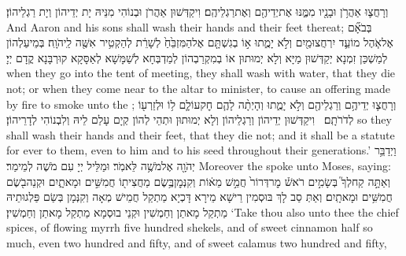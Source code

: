 {וְרָחֲצ֛וּ אַהֲרֹ֥ן וּבָנָ֖יו מִמֶּ֑נּוּ אֶת\maqqaf יְדֵיהֶ֖ם וְאֶת\maqqaf רַגְלֵיהֶֽם׃}
{וִיקַדְּשׁוּן אַהֲרֹן וּבְנוֹהִי מִנֵּיהּ יָת יְדֵיהוֹן וְיָת רַגְלֵיהוֹן׃}
{And Aaron and his sons shall wash their hands and their feet thereat;}{}
{בְּבֹאָ֞ם אֶל\maqqaf אֹ֧הֶל מוֹעֵ֛ד יִרְחֲצוּ\maqqaf מַ֖יִם וְלֹ֣א יָמֻ֑תוּ א֣וֹ בְגִשְׁתָּ֤ם אֶל\maqqaf הַמִּזְבֵּ֙חַ֙ לְשָׁרֵ֔ת לְהַקְטִ֥יר אִשֶּׁ֖ה לַֽיהֹוָֽה׃}
{בְּמֵיעַלְהוֹן לְמַשְׁכַּן זִמְנָא יְקַדְּשׁוּן מַיָּא וְלָא יְמוּתוּן אוֹ בְמִקְרַבְהוֹן לְמַדְבְּחָא לְשַׁמָּשָׁא לְאַסָּקָא קוּרְבָּנָא קֳדָם יְיָ׃}
{when they go into the tent of meeting, they shall wash with water, that they die not; or when they come near to the altar to minister, to cause an offering made by fire to smoke unto the \lord;}{}
{וְרָחֲצ֛וּ יְדֵיהֶ֥ם וְרַגְלֵיהֶ֖ם וְלֹ֣א יָמֻ֑תוּ וְהָיְתָ֨ה לָהֶ֧ם חׇק\maqqaf עוֹלָ֛ם ל֥וֹ וּלְזַרְע֖וֹ לְדֹרֹתָֽם׃ \petucha }
{וִיקַדְּשׁוּן יְדֵיהוֹן וְרַגְלֵיהוֹן וְלָא יְמוּתוּן וּתְהֵי לְהוֹן קְיָם עָלַם לֵיהּ וְלִבְנוֹהִי לְדָרֵיהוֹן׃}
{so they shall wash their hands and their feet, that they die not; and it shall be a statute for ever to them, even to him and to his seed throughout their generations.’}{}
{וַיְדַבֵּ֥ר יְהֹוָ֖ה אֶל\maqqaf מֹשֶׁ֥ה לֵּאמֹֽר׃}
{וּמַלֵּיל יְיָ עִם מֹשֶׁה לְמֵימַר׃}
{Moreover the \lord\space spoke unto Moses, saying:}{}
{וְאַתָּ֣ה קַח\maqqaf לְךָ֮ בְּשָׂמִ֣ים רֹאשׁ֒ מׇר\maqqaf דְּרוֹר֙ חֲמֵ֣שׁ מֵא֔וֹת וְקִנְּמׇן\maqqaf בֶּ֥שֶׂם מַחֲצִית֖וֹ חֲמִשִּׁ֣ים וּמָאתָ֑יִם וּקְנֵה\maqqaf בֹ֖שֶׂם חֲמִשִּׁ֥ים וּמָאתָֽיִם׃}
{וְאַתְּ סַב לָךְ בּוּסְמִין רֵישָׁא מֵירָא דָּכְיָא מַתְקַל חֲמֵישׁ מְאָה וְקִנְּמָן בְּשַׂם פַּלְגוּתֵיהּ מַתְקַל מָאתַן וְחַמְשִׁין וּקְנֵי בוּסְמָא מַתְקַל מָאתַן וְחַמְשִׁין׃}
{‘Take thou also unto thee the chief spices, of flowing myrrh five hundred shekels, and of sweet cinnamon half so much, even two hundred and fifty, and of sweet calamus two hundred and fifty,}{}
